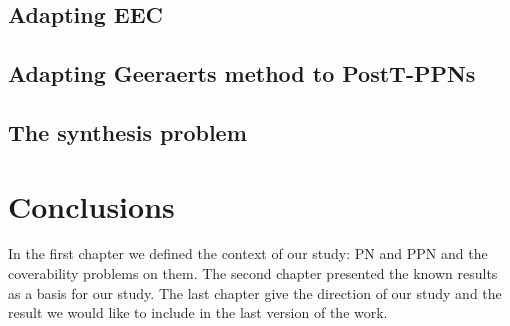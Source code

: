 \documentclass[11pt,a4paper,oneside]{book}
\theoremstyle{plain}
\theoremstyle{definition}
\theoremstyle{remark}
\begin{document}
\section{Adapting \ac{EEC}}%
\label{sec:adapting-eec}


\section{Adapting Geeraerts method to PostT-\acp{PPN}}
\label{sec:adapting-geeraerts-method-to-postt-ppn}



\section{The synthesis problem}
\label{sec:the-synthesis-problem}


\vspace*{0.5cm}
\acresetall

\chapter*{Conclusions}

In the first chapter we defined the context of our study: \ac{PN} and \ac{PPN} and the coverability problems on them.
The second chapter presented the known results as a basis for our study.
The last chapter give the direction of our study and the result we would like to include in the last version of the work.

\appendix

\backmatter

\printindex %



\end{document}
